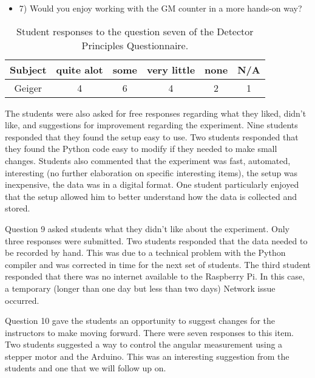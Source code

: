 \begin{table}[htpb]
  \scriptsize
  \begin{center}
    \caption{\scriptsize Student responses to the question seven of the Detector Principles Questionnaire.}
    \label{tab:t12q7}
    \begin{itemize}
    \item  7) Would you enjoy working with the GM counter in a more hands-on way?
    \end{itemize}
    

    \begin{tabular}{|c | c | c | c | c | c|}
      \hline
      Subject & quite alot & some & very little & none & N/A\\
      \hline
      Geiger & 4 & 6 & 4 & 2 & 1 \\
      \hline
    \end{tabular}
  \end{center}%
\end{table}


The students were also asked for free responses regarding what they liked, didn't like, and suggestions for improvement regarding the experiment.
Nine students responded that they found the setup easy to use.
Two students responded that they found the Python code easy to modify if they needed to make small changes.
Students also commented that the experiment was fast, automated, interesting (no further elaboration on specific interesting items), the setup was inexpensive, the data was in a digital format.
One student particularly enjoyed that the setup allowed him to better understand how the data is collected and stored.

Question 9 asked students what they didn't like about the experiment.
Only three responses were submitted.
Two students responded that the data needed to be recorded by hand.
This was due to a technical problem with the Python compiler and was corrected in time for the next set of students.
The third student responded that there was no internet available to the Raspberry Pi.
In this case, a temporary (longer than one day but less than two days) Network issue occurred.

Question 10 gave the students an opportunity to suggest changes for the instructors to make moving forward.
There were seven responses to this item.
Two students suggested a way to control the angular measurement using a stepper motor and the Arduino.
This was an interesting suggestion from the students and one that we will follow up on.

